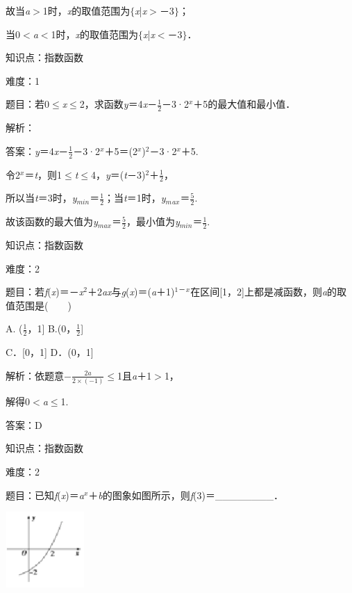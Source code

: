 \documentclass{article} %
\begin{document}
故当\textit{a}$\mathrm{>}$1时，\textit{x}的取值范围为$\mathrm{\{}$\textit{x}|\textit{x}$\mathrm{>}$－3$\mathrm{\}}$；

当0$\mathrm{<}$\textit{a}$\mathrm{<}$1时，\textit{x}的取值范围为$\mathrm{\{}$\textit{x}|\textit{x}$\mathrm{<}$－3$\mathrm{\}}$．

知识点：指数函数

难度：1

题目：若0$\mathrm{\le}$\textit{x}$\mathrm{\le}$2，求函数\textit{y}＝4\textit{x}－$\frac{1}{2}$－3·2\textit{${}^{x}$}＋5的最大值和最小值．

解析：

答案：\textit{y}＝4\textit{x}－$\frac{1}{2}$－3·2\textit{${}^{x}$}＋5＝(2\textit{${}^{x}$})${}^{2}$－3·2\textit{${}^{x}$}＋5.

令2\textit{${}^{x}$}＝\textit{t}，则1$\mathrm{\le}$\textit{t}$\mathrm{\le}$4，\textit{y}＝(\textit{t}－3)${}^{2}$＋$\frac{1}{2}$，

所以当\textit{t}＝3时，\textit{y}${}_{min}$＝$\frac{1}{2}$；当\textit{t}＝1时，\textit{y}${}_{m}$${}_{ax}$＝$\frac{5}{2}$.

故该函数的最大值为\textit{y}${}_{max}$＝$\frac{5}{2}$，最小值为\textit{y}${}_{min}$＝$\frac{1}{2}$.

知识点：指数函数

难度：2

题目：若\textit{f}(\textit{x})＝－\textit{x}${}^{2}$＋2\textit{ax}与\textit{g}(\textit{x})＝(\textit{a}＋1)${}^{1}$${}^{\textrm{－}}$\textit{${}^{x}$}在区间[1，2]上都是减函数，则\textit{a}的取值范围是(　　)

A. ($\frac{1}{2}$，1]   B.(0，$\frac{1}{2}$]

C．[0，1]   D．(0，1]

解析：依题意$-\frac{2a}{2\times(-1)}$$\mathrm{\le}$1且\textit{a}＋1$\mathrm{>}$1，

解得0$\mathrm{<}$\textit{a}$\mathrm{\le}$1.

答案：D

知识点：指数函数

难度：2

题目：已知\textit{f}(\textit{x})＝\textit{a${}^{x}$}＋\textit{b}的图象如图所示，则\textit{f}(3)＝\_\_\_\_\_\_\_\_．

\includegraphics*[width=1.19in, height=1.13in, keepaspectratio=false]{image53}
\end{document}
